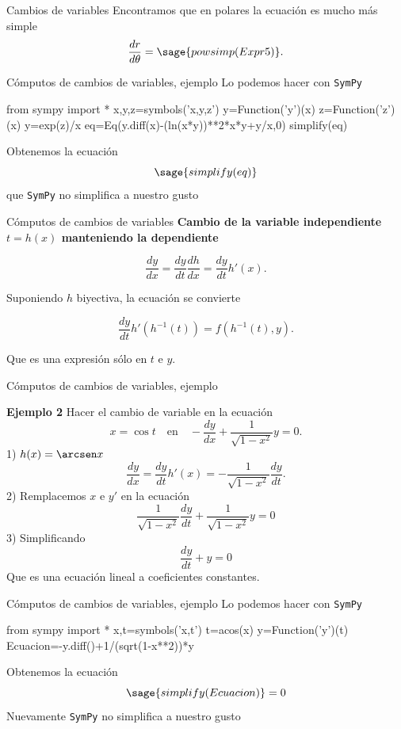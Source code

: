 \documentclass[handout,hyperref={colorlinks=true}]{beamer}
\begin{document}
\begin{frame}[fragile]{Cambios de variables}
Encontramos que en polares la ecuación es mucho más simple
\[\frac{dr}{d\theta}=\sage{powsimp(Expr5)}.\]

\end{frame}



\begin{frame}[fragile]{Cómputos de cambios de variables, ejemplo}
Lo podemos hacer con \texttt{SymPy}

\begin{sageblock}
from sympy import *
x,y,z=symbols('x,y,z')
y=Function('y')(x)
z=Function('z')(x)
y=exp(z)/x
eq=Eq(y.diff(x)-(ln(x*y))**2*x*y+y/x,0)
simplify(eq)
\end{sageblock}
Obtenemos la ecuación
\[\sage{simplify(eq)}\]
que \texttt{SymPy} no simplifica a nuestro gusto
\end{frame}



\begin{frame}{Cómputos de cambios de variables}
\textbf{Cambio de la variable independiente $t=h(x)$ manteniendo la dependiente} 

\[\frac{dy}{dx}=\frac{dy}{dt}\frac{dh}{dx}=\frac{dy}{dt}h'(x).\]

Suponiendo $h$ biyectiva, la ecuación se convierte

\[\frac{dy}{dt}h'(h^{-1}(t))=f(h^{-1}(t),y).\]

Que es una expresión sólo en $t$ e $y$. 



\end{frame}

\begin{frame}{Cómputos de cambios de variables, ejemplo}

\textbf{Ejemplo 2} Hacer el cambio de variable en la  ecuación 
\[x=\cos t\quad\text{en}\quad  -\frac{dy}{dx}+\frac{1}{\sqrt{1-x^2}}y=0.\]
1) $h(x)=\arcsen x$
\[\frac{dy}{dx}=\frac{dy}{dt}h'(x)=-\frac{1}{\sqrt{1-x^2}}\frac{dy}{dt}.\]
2) Remplacemos $x$ e $y'$ en la ecuación 
\[\frac{1}{\sqrt{1-x^2}}\frac{dy}{dt}+ \frac{1}{\sqrt{1-x^2}}y=0\]
3) Simplificando
\[\frac{dy}{dt}+ y=0\]
Que es una ecuación lineal a coeficientes constantes.


\end{frame}

\begin{frame}[fragile]{Cómputos de cambios de variables, ejemplo}
Lo podemos hacer con \texttt{SymPy}

\begin{sageblock}
from sympy import *
x,t=symbols('x,t')
t=acos(x)
y=Function('y')(t)
Ecuacion=-y.diff()+1/(sqrt(1-x**2))*y
\end{sageblock}
Obtenemos la ecuación
\[\sage{simplify(Ecuacion)}=0\]
Nuevamente \texttt{SymPy} no simplifica a nuestro gusto
\end{frame}
\end{document}
